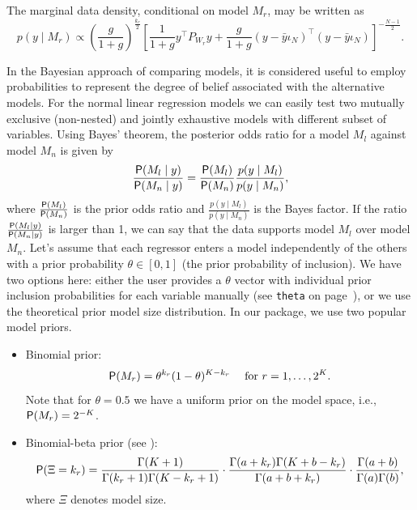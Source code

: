 The marginal data density, conditional on model $M_r$, may be written
as
\begin{equation}
	p(y \mid M_r) \propto \left (\frac{g}{1+g}\right)^{\frac{k_r}{2}}
	\left [  \frac{1}{1+g}y^\top P_{W_r}y + \frac{g}{1+g} \left( y-\bar y\iota_N \right)^\top
	\left( y-\bar y\iota_N \right) \right]^{-\frac{N-1}{2}}.
	\label{eq:marginal_data_density}
\end{equation}

In the Bayesian approach of comparing models, it is considered useful
to employ probabilities to represent the degree of belief associated
with the alternative models. For the normal linear regression models
we can easily test two mutually exclusive (non-nested) and jointly
exhaustive models with different subset of variables.  Using Bayes'
theorem, the posterior odds ratio for a model $M_l$ against model
$M_n$ is given by
\begin{equation}
	\frac{\mathsf{P}(M_l \mid y)}{\mathsf{P}(M_n \mid y)}=\frac{\mathsf{P}(M_l)}{\mathsf{P}(M_n)}\frac{p(y \mid M_l)}{p(y \mid M_n)},
	\label{eq:posterior_odds_ratio}
\end{equation}
where $\frac{\mathsf{P}(M_l)}{\mathsf{P}(M_n)}$ is the prior odds ratio and
$\frac{p(y \mid M_l)}{p(y \mid M_n)}$ is the Bayes factor. If the
ratio $\frac{\mathsf{P}(M_l \mid y)}{\mathsf{P}(M_n \mid y)}$ is larger than 1,
we can say that the data supports model $M_l$ over model $M_n$.
Let's assume that each regressor enters a model independently
of the others with a prior probability $\theta \in [0, 1]$
(the prior probability of inclusion). We have two options here:
either the user provides a $\theta$ vector with individual
prior inclusion probabilities for each variable manually
(see \lstinline!theta! on page~\pageref{opts:theta}),
or we use the theoretical prior model size distribution.
In our package, we use two popular model priors.
\begin{itemize}\label{misc:priors}
	\item Binomial prior:
	\begin{equation}
		\mathsf{P}(M_r)=\theta^{k_r}(1-\theta)^{K-k_r}\; \quad\mathrm{for~} r=1, \dots, 2^K.
		\label{eq:model_prior_binomial}
	\end{equation}    
	Note that for $\theta=0.5$ we have a uniform prior on the model space, i.e., $\mathsf{P}(M_r)=2^{-K}$.
	\item Binomial-beta prior (see \citealt{GelmanCarlinSternRubin1997}):
	\begin{equation}
		\mathsf{P}(\Xi=k_r)= \frac{\Gamma (K+1)}{\Gamma(k_r+1)\Gamma(K-k_r+1)}\cdot
		\frac{\Gamma(a+k_r)\Gamma(K+b-k_r)}{\Gamma(a+b+k_r)} \cdot \frac{\Gamma(a+b)}{\Gamma(a)\Gamma(b)},
		\label{eq:model_prior_binomial-beta}
	\end{equation}
	where $\Xi$ denotes model size. 
\end{itemize}

